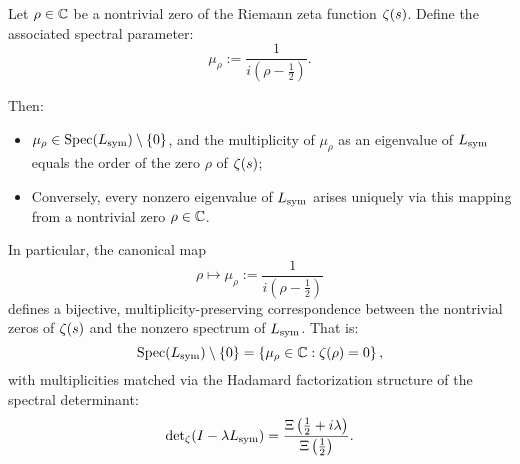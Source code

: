 \begin{lemma}
\label{lem:spectral_zero_encoding}

Let \( \rho \in \mathbb{C} \) be a nontrivial zero of the Riemann zeta function \( \zeta(s) \). Define the associated spectral parameter:
\[
\mu_\rho := \frac{1}{i(\rho - \tfrac{1}{2})}.
\]

Then:
\begin{itemize}
  \item \( \mu_\rho \in \operatorname{Spec}(L_{\mathrm{sym}}) \setminus \{0\} \), and the multiplicity of \( \mu_\rho \) as an eigenvalue of \( L_{\mathrm{sym}} \) equals the order of the zero \( \rho \) of \( \zeta(s) \);

  \item Conversely, every nonzero eigenvalue of \( L_{\mathrm{sym}} \) arises uniquely via this mapping from a nontrivial zero \( \rho \in \mathbb{C} \).
\end{itemize}

\medskip

\noindent
In particular, the canonical map
\[
\rho \mapsto \mu_\rho := \frac{1}{i(\rho - \tfrac{1}{2})}
\]
defines a bijective, multiplicity-preserving correspondence between the nontrivial zeros of \( \zeta(s) \) and the nonzero spectrum of \( L_{\mathrm{sym}} \). That is:
\[
\operatorname{Spec}(L_{\mathrm{sym}}) \setminus \{0\} = \left\{ \mu_\rho \in \mathbb{C} : \zeta(\rho) = 0 \right\},
\]
with multiplicities matched via the Hadamard factorization structure of the spectral determinant:
\[
\det\nolimits_\zeta(I - \lambda L_{\mathrm{sym}}) = \frac{\Xi\left( \tfrac{1}{2} + i\lambda \right)}{\Xi\left( \tfrac{1}{2} \right)}.
\]
\end{lemma}
